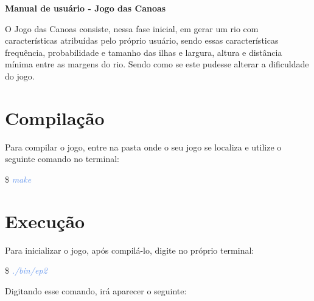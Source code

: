 \documentclass[a4paper,12pt]{article}
\begin{document}
  \begin{center} 
	{\LARGE \textcolor{NavyBlue}{ \textbf{Manual de usuário - Jogo das Canoas}}}
  \end{center}

  \bigskip
  \bigskip

  O Jogo das Canoas consiste, nessa fase inicial, em gerar um rio com 
  características atribuídas pelo próprio usuário, sendo essas características 
  frequência, probabilidade e tamanho das ilhas e largura, altura e distância
  mínima entre as margens do rio. Sendo como se este pudesse alterar a dificuldade do jogo.


\newpage %
\section{\textcolor{NavyBlue}{Compilação}}

Para compilar o jogo, entre na pasta onde o seu jogo se localiza e utilize o seguinte comando no terminal:

\$ \textcolor{CornflowerBlue}{\textit{make}}

\bigskip
\section{\textcolor{NavyBlue}{Execução}}

  Para inicializar o jogo, após compilá-lo, digite no próprio terminal:
  
  \$ \textcolor{CornflowerBlue}{\textit{./bin/ep2}}
  
  Digitando esse comando, irá aparecer o seguinte:
\end{document}
